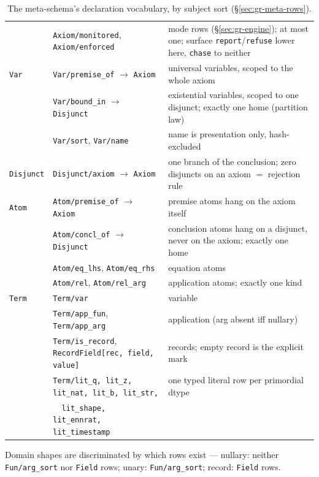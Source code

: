 \begin{table}[htbp]
\begin{tabular}{@{}ll>{\raggedright\arraybackslash}p{}@{}}
 & \texttt{Axiom/monitored}, \texttt{Axiom/enforced} & mode rows (\S\ref{sec:gr-engine}); at most one; surface \texttt{report}/\texttt{refuse} lower here, \texttt{chase} to neither \\
\texttt{Var} & \texttt{Var/premise\_of} $\to$ \texttt{Axiom} & universal variables, scoped to the whole axiom \\
 & \texttt{Var/bound\_in} $\to$ \texttt{Disjunct} & existential variables, scoped to one disjunct; exactly one home (partition law) \\
 & \texttt{Var/sort}, \texttt{Var/name} & name is presentation only, hash-excluded \\
\texttt{Disjunct} & \texttt{Disjunct/axiom} $\to$ \texttt{Axiom} & one branch of the conclusion; zero disjuncts on an axiom $=$ rejection rule \\
\texttt{Atom} & \texttt{Atom/premise\_of} $\to$ \texttt{Axiom} & premise atoms hang on the axiom itself \\
 & \texttt{Atom/concl\_of} $\to$ \texttt{Disjunct} & conclusion atoms hang on a disjunct, never on the axiom; exactly one home \\
 & \texttt{Atom/eq\_lhs}, \texttt{Atom/eq\_rhs} & equation atoms \\
 & \texttt{Atom/rel}, \texttt{Atom/rel\_arg} & application atoms; exactly one kind \\
\texttt{Term} & \texttt{Term/var} & variable \\
 & \texttt{Term/app\_fun}, \texttt{Term/app\_arg} & application (arg absent iff nullary) \\
 & \texttt{Term/is\_record}, \texttt{RecordField[rec, field, value]} & records; empty record is the explicit mark \\
 & \texttt{Term/lit\_q,\,lit\_z,\,lit\_nat,\,lit\_b,\,lit\_str,} & one typed literal row per primordial dtype \\
 & \texttt{\ \ lit\_shape,\,lit\_ennrat,\,lit\_timestamp} & \\
\bottomrule
\end{tabular}
\caption{The meta-schema's declaration vocabulary, by subject sort
(\S\ref{sec:gr-meta-rows}).}
\label{tab:gr-meta-rows}
\end{table}

Domain shapes are discriminated by which rows exist —
nullary: neither \texttt{Fun/arg\_sort} nor \texttt{Field} rows;
unary: \texttt{Fun/arg\_sort}; record: \texttt{Field} rows.

